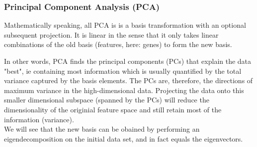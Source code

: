 \documentclass[journal, a4paper]{IEEEtran}
\begin{document}
\subsubsection{Principal Component Analysis (PCA)}


Mathematically speaking, all PCA is is a basis transformation with an optional subsequent projection. It is linear in the sense that it only takes linear combinations of the old basis (features, here: genes) to form the new basis. 

In other words, PCA finds the principal components (PCs) that explain the data "best", ie containing most information which is usually quantified by the total variance captured by the basis elements. The PCs are, therefore, the directions of maximum variance in the high-dimensional data. Projecting the data onto this smaller dimensional subspace (spanned by the PCs) will reduce the dimensionality of the originial feature space and still retain most of the information (variance). \\
We will see that the new basis can be obained by performing an eigendecomposition on the initial data set, and in fact equals the eigenvectors.


\end{document}
